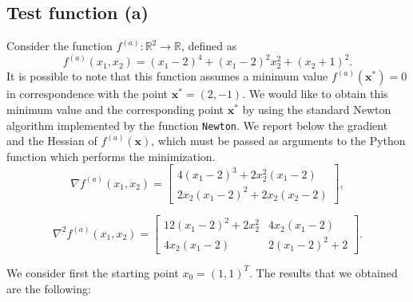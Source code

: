 \documentclass[a4paper,11pt]{article}
\newcommand{\R}{\mathbb{R}}
\begin{document}
	\subsection*{Test function (a)}
	Consider the function $f^{(a)}: \R^{2}\rightarrow \R$, defined as
	\begin{equation}
		f^{(a)}(x_{1},x_{2}) = (x_{1}-2)^{4} + (x_{1}-2)^{2}x_{2}^{2} + (x_{2}+1)^{2}.
	\end{equation}
	It is possible to note that this function assumes a minimum value $f^{(a)}(\textbf{x}^*)=0$ in correspondence with the point $\textbf{x}^*=(2,-1)$. We would like to obtain this minimum value and the corresponding point $\textbf{x}^*$ by using the standard Newton algorithm implemented by the function \texttt{Newton}. We report below the gradient and the Hessian of $f^{(a)}(\textbf{x})$, which must be passed as arguments to the Python function which performs the minimization.
	\begin{equation}
		\nabla f^{(a)}(x_{1},x_{2}) = \begin{bmatrix}
			4(x_{1}-2)^{3} + 2x_{2}^{2}(x_{1}-2)\\
			2x_{2}(x_{1}-2)^{2} + 2x_{2}(x_{2}-2)
		\end{bmatrix},
	\end{equation}

		\begin{equation}
		\nabla^{2} f^{(a)}(x_{1},x_{2}) = \begin{bmatrix}
			12(x_{1}-2)^{2} + 2x_{2}^{2} & 4x_{2}(x_{1}-2)\\
			4x_{2}(x_{1}-2) & 2(x_{1}-2)^{2} + 2
		\end{bmatrix}.
	\end{equation}
	
	\noindent We consider first the starting point $x_{0}=(1,1)^{T}$. The results that we obtained are the following:
	
\end{document}
